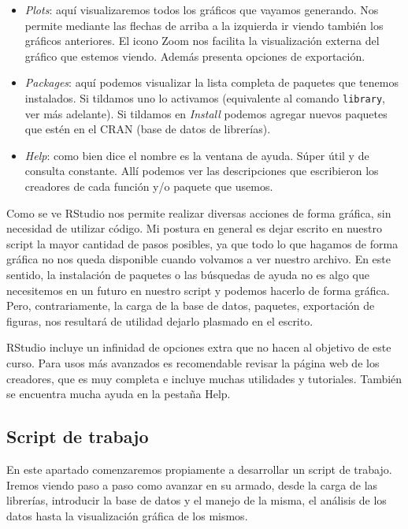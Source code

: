 \documentclass[
  letterpaper,
  DIV=11,
  numbers=noendperiod]{scrartcl}
\providecommand{\tightlist}{%
  \setlength{\itemsep}{0pt}\setlength{\parskip}{0pt}}\usepackage{longtable,booktabs,array}
\begin{document}
\begin{itemize}
\tightlist
\item
  \emph{Plots}: aquí visualizaremos todos los gráficos que vayamos
  generando. Nos permite mediante las flechas de arriba a la izquierda
  ir viendo también los gráficos anteriores. El icono Zoom nos facilita
  la visualización externa del gráfico que estemos viendo. Además
  presenta opciones de exportación.
\item
  \emph{Packages}: aquí podemos visualizar la lista completa de paquetes
  que tenemos instalados. Si tildamos uno lo activamos (equivalente al
  comando \texttt{library}, ver más adelante). Si tildamos en
  \emph{Install} podemos agregar nuevos paquetes que estén en el CRAN
  (base de datos de librerías).
\item
  \emph{Help}: como bien dice el nombre es la ventana de ayuda. Súper
  útil y de consulta constante. Allí podemos ver las descripciones que
  escribieron los creadores de cada función y/o paquete que usemos.
\end{itemize}

Como se ve RStudio nos permite realizar diversas acciones de forma
gráfica, sin necesidad de utilizar código. Mi postura en general es
dejar escrito en nuestro script la mayor cantidad de pasos posibles, ya
que todo lo que hagamos de forma gráfica no nos queda disponible cuando
volvamos a ver nuestro archivo. En este sentido, la instalación de
paquetes o las búsquedas de ayuda no es algo que necesitemos en un
futuro en nuestro script y podemos hacerlo de forma gráfica. Pero,
contrariamente, la carga de la base de datos, paquetes, exportación de
figuras, nos resultará de utilidad dejarlo plasmado en el escrito.

RStudio incluye un infinidad de opciones extra que no hacen al objetivo
de este curso. Para usos más avanzados es recomendable revisar la página
web de los creadores, que es muy completa e incluye muchas utilidades y
tutoriales. También se encuentra mucha ayuda en la pestaña Help.

\hypertarget{script-de-trabajo}{%
\subsection{Script de trabajo}\label{script-de-trabajo}}

En este apartado comenzaremos propiamente a desarrollar un script de
trabajo. Iremos viendo paso a paso como avanzar en su armado, desde la
carga de las librerías, introducir la base de datos y el manejo de la
misma, el análisis de los datos hasta la visualización gráfica de los
mismos.
\end{document}
